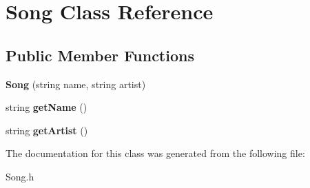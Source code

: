 \hypertarget{class_song}{}\section{Song Class Reference}
\label{class_song}
\subsection*{Public Member Functions}
\begin{DoxyCompactItemize}
\item 
\hypertarget{class_song_a3abce584235f884768ea92d434391a8f}{}\label{class_song_a3abce584235f884768ea92d434391a8f} 
{\bfseries Song} (string name, string artist)
\item 
\hypertarget{class_song_a3f7cd6a69f4cca7ad4d8df51f7474847}{}\label{class_song_a3f7cd6a69f4cca7ad4d8df51f7474847} 
string {\bfseries get\+Name} ()
\item 
\hypertarget{class_song_a07dcbecc06e304ab0e243d612fae785d}{}\label{class_song_a07dcbecc06e304ab0e243d612fae785d} 
string {\bfseries get\+Artist} ()
\end{DoxyCompactItemize}


The documentation for this class was generated from the following file\+:\begin{DoxyCompactItemize}
\item 
Song.\+h\end{DoxyCompactItemize}
